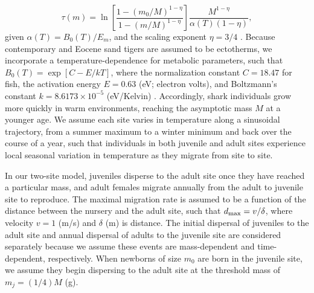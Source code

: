 \documentclass[]{rsos}%
\begin{document}
\begin{equation}
\label{t1}
\tau\left(m\right) = \ln\left[\frac{1-\left(m_{0}/M\right)^{1-\eta}}{1-(m/M)^{1-\eta}}\right]\frac{M^{1-\eta}}{\alpha(T)\left(1-\eta\right)},
\end{equation}
given $\alpha(T)=B_0(T)/E_m$, and the scaling exponent $\eta = 3/4$ \cite{yeakel2018dynamics}. 
Because contemporary and Eocene sand tigers are assumed to be ectotherms, we incorporate a temperature-dependence for metabolic parameters, such that $B_0(T) = \exp[C-E/kT]$, where the normalization constant $C=18.47$ for fish, the activation energy $E=0.63$ (eV; electron volts), and Boltzmann's constant $k=8.6173\times 10^{-5}$ (eV/Kelvin) \cite{Brown2004}. %
Accordingly, shark individuals grow more quickly in warm environments, reaching the asymptotic mass $M$ at a younger age.
We assume each site varies in temperature along a sinusoidal trajectory, from a summer maximum to a winter minimum and back over the course of a year, such that individuals in both juvenile and adult sites experience local seasonal variation in temperature as they migrate from site to site.

 
 


In our two-site model, juveniles disperse to the adult site once they have reached a particular mass, and adult females migrate annually from the adult to juvenile site to reproduce.
The maximal migration rate is assumed to be a function of the distance between the nursery and the adult site, such that $d_{\rm max} = v/\delta$, where velocity $v=1$ (m/s) and $\delta$ (m) is distance. 
The initial dispersal of juveniles to the adult site and annual dispersal of adults to the juvenile site are considered separately because we assume these events are mass-dependent and time-dependent, respectively.
When newborns of size $m_0$ are born in the juvenile site, we assume they begin dispersing to the adult site at the threshold mass of $m_j = (1/4)M$ (g).
\end{document}

